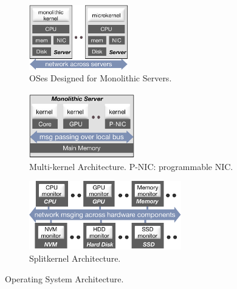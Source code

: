 {
\begin{figure}[th]
\begin{subfigure}{1.7in}
\begin{center}
\centerline{\includegraphics[width=1.7in]{lego/Figures/monolithic-arch.pdf}}
\caption[Monolithic OS.]{OSes Designed for Monolithic Servers.}
\label{fig-monolithic}
\end{center}
\end{subfigure}
\begin{minipage}{0.05in}
\hspace{0.05in}
\end{minipage}
\begin{subfigure}{1.8in}
\begin{center}
\centerline{\includegraphics[width=1.8in]{lego/Figures/multikernel-arch.pdf}}
\caption[Multikernel Architecture.]{Multi-kernel Architecture. \small{P-NIC: programmable NIC.}}
\label{fig-multikernel}
\end{center}
\end{subfigure}
\begin{minipage}{0.05in}
\hspace{0.05in}
\end{minipage}
\begin{subfigure}{2.5in}
\begin{center}
\centerline{\includegraphics[width=2.6in]{lego/Figures/lego-arch.pdf}}
\caption[Splitkernel Architecture.]{Splitkernel Architecture.}
\label{fig-splitkernel}
\end{center}
\end{subfigure}
\caption[Operating System Architecture.]{Operating System Architecture.}
\end{figure}
}
